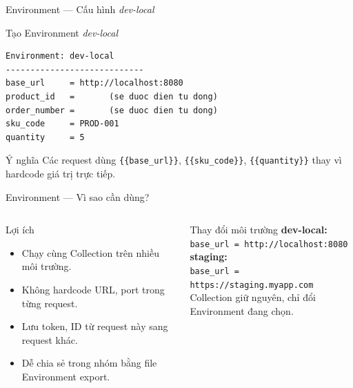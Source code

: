 \documentclass[aspectratio=169,10pt]{beamer}
\begin{document}
\begin{frame}[fragile]{Environment --- Cấu hình \textit{dev-local}}
  \begin{block}{Tạo Environment \textit{dev-local}}
\begin{lstlisting}[style=json,language={}]
Environment: dev-local
----------------------------
base_url     = http://localhost:8080
product_id   =       (se duoc dien tu dong)
order_number =       (se duoc dien tu dong)
sku_code     = PROD-001
quantity     = 5
\end{lstlisting}
  \end{block}

  \begin{alertblock}{Ý nghĩa}
    Các request dùng \texttt{\{\{base\_url\}\}}, \texttt{\{\{sku\_code\}\}},
    \texttt{\{\{quantity\}\}} thay vì hardcode giá trị trực tiếp.
  \end{alertblock}
\end{frame}

\begin{frame}{Environment --- Vì sao cần dùng?}
  \begin{columns}[T]
    \begin{block}{Lợi ích}
      \begin{itemize}
        \item Chạy cùng Collection trên nhiều môi trường.
        \item Không hardcode URL, port trong từng request.
        \item Lưu token, ID từ request này sang request khác.
        \item Dễ chia sẻ trong nhóm bằng file Environment export.
      \end{itemize}
    \end{block}

    \begin{exampleblock}{Thay đổi môi trường}
      \textbf{dev-local:}\\
      \texttt{base\_url = http://localhost:8080}\\[0.5em]
      \textbf{staging:}\\
      \texttt{base\_url = https://staging.myapp.com}\\[0.5em]
      Collection giữ nguyên, chỉ đổi Environment đang chọn.
    \end{exampleblock}
  \end{columns}
\end{frame}
\end{document}
